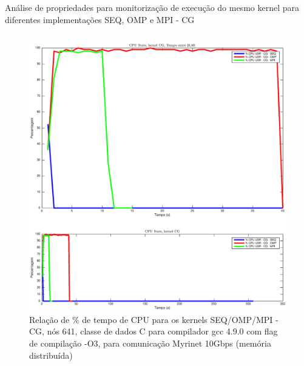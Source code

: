 \documentclass{beamer}
\begin{document}
\begin{frame}{ \tiny Análise de propriedades para monitorização de execução do mesmo kernel para diferentes implementações SEQ, OMP e MPI - CG}

\begin{columns}[t]
\centering
\begin{figure}[H]
\centering
\includegraphics[width=0.9\columnwidth]{EPS/dstat_CG_seq_vs_omp_vs_mpi/cpu.eps}
\caption{\tiny  Relação de \% de tempo de CPU para os kernels SEQ/OMP/MPI - CG, nós 641, classe de dados C para compilador gcc 4.9.0 com flag de compilação  -O3, para comunicação Myrinet 10Gbps (memória distribuída)}
\label{dstat_cg_SOM_cpu}
\end{figure}


\end{columns}
\end{frame}
\end{document}
